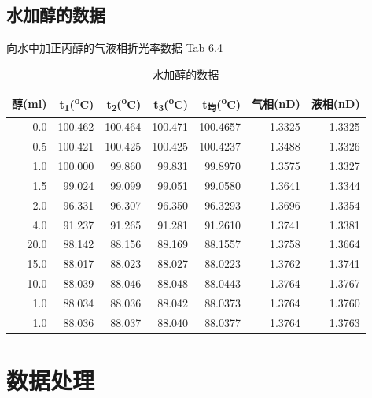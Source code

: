 \documentclass[11pt]{report}
\begin{document}
\section{水加醇的数据}
\label{sec:org76a0398}
向水中加正丙醇的气液相折光率数据 Tab 6.4
\begin{table}[htbp]
\caption{\label{tab:org61243eb}水加醇的数据}
\centering
\begin{tabular}{rrrrrrr}
醇(ml) & t\textsubscript{1}(\textsuperscript{o}C) & t\textsubscript{2}(\textsuperscript{o}C) & t\textsubscript{3}(\textsuperscript{o}C) & t\textsubscript{均}(\textsuperscript{o}C) & 气相(nD) & 液相(nD)\\
\hline
0.0 & 100.462 & 100.464 & 100.471 & 100.4657 & 1.3325 & 1.3325\\
0.5 & 100.421 & 100.425 & 100.425 & 100.4237 & 1.3488 & 1.3326\\
1.0 & 100.000 & 99.860 & 99.831 & 99.8970 & 1.3575 & 1.3327\\
1.5 & 99.024 & 99.099 & 99.051 & 99.0580 & 1.3641 & 1.3344\\
2.0 & 96.331 & 96.307 & 96.350 & 96.3293 & 1.3696 & 1.3354\\
4.0 & 91.237 & 91.265 & 91.281 & 91.2610 & 1.3741 & 1.3381\\
20.0 & 88.142 & 88.156 & 88.169 & 88.1557 & 1.3758 & 1.3664\\
15.0 & 88.017 & 88.023 & 88.027 & 88.0223 & 1.3762 & 1.3741\\
10.0 & 88.039 & 88.046 & 88.048 & 88.0443 & 1.3764 & 1.3767\\
1.0 & 88.034 & 88.036 & 88.042 & 88.0373 & 1.3764 & 1.3760\\
1.0 & 88.036 & 88.037 & 88.040 & 88.0377 & 1.3764 & 1.3763\\
\end{tabular}
\end{table}

\chapter{数据处理}
\label{sec:org79b80c8}
\end{document}
